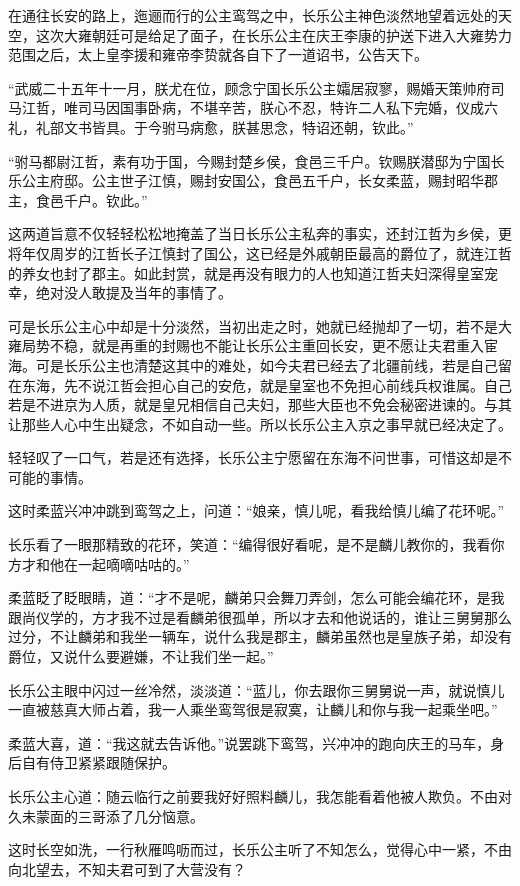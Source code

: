 在通往长安的路上，迤逦而行的公主鸾驾之中，长乐公主神色淡然地望着远处的天空，这次大雍朝廷可是给足了面子，在长乐公主在庆王李康的护送下进入大雍势力范围之后，太上皇李援和雍帝李贽就各自下了一道诏书，公告天下。

“武威二十五年十一月，朕尤在位，顾念宁国长乐公主孀居寂寥，赐婚天策帅府司马江哲，唯司马因国事卧病，不堪辛苦，朕心不忍，特许二人私下完婚，仪成六礼，礼部文书皆具。于今驸马病愈，朕甚思念，特诏还朝，钦此。”

“驸马都尉江哲，素有功于国，今赐封楚乡侯，食邑三千户。钦赐朕潜邸为宁国长乐公主府邸。公主世子江慎，赐封安国公，食邑五千户，长女柔蓝，赐封昭华郡主，食邑千户。钦此。”

这两道旨意不仅轻轻松松地掩盖了当日长乐公主私奔的事实，还封江哲为乡侯，更将年仅周岁的江哲长子江慎封了国公，这已经是外戚朝臣最高的爵位了，就连江哲的养女也封了郡主。如此封赏，就是再没有眼力的人也知道江哲夫妇深得皇室宠幸，绝对没人敢提及当年的事情了。

可是长乐公主心中却是十分淡然，当初出走之时，她就已经抛却了一切，若不是大雍局势不稳，就是再重的封赐也不能让长乐公主重回长安，更不愿让夫君重入宦海。可是长乐公主也清楚这其中的难处，如今夫君已经去了北疆前线，若是自己留在东海，先不说江哲会担心自己的安危，就是皇室也不免担心前线兵权谁属。自己若是不进京为人质，就是皇兄相信自己夫妇，那些大臣也不免会秘密进谏的。与其让那些人心中生出疑念，不如自动一些。所以长乐公主入京之事早就已经决定了。

轻轻叹了一口气，若是还有选择，长乐公主宁愿留在东海不问世事，可惜这却是不可能的事情。

这时柔蓝兴冲冲跳到鸾驾之上，问道：“娘亲，慎儿呢，看我给慎儿编了花环呢。”

长乐看了一眼那精致的花环，笑道：“编得很好看呢，是不是麟儿教你的，我看你方才和他在一起嘀嘀咕咕的。”

柔蓝眨了眨眼睛，道：“才不是呢，麟弟只会舞刀弄剑，怎么可能会编花环，是我跟尚仪学的，方才我不过是看麟弟很孤单，所以才去和他说话的，谁让三舅舅那么过分，不让麟弟和我坐一辆车，说什么我是郡主，麟弟虽然也是皇族子弟，却没有爵位，又说什么要避嫌，不让我们坐一起。”

长乐公主眼中闪过一丝冷然，淡淡道：“蓝儿，你去跟你三舅舅说一声，就说慎儿一直被慈真大师占着，我一人乘坐鸾驾很是寂寞，让麟儿和你与我一起乘坐吧。”

柔蓝大喜，道：“我这就去告诉他。”说罢跳下鸾驾，兴冲冲的跑向庆王的马车，身后自有侍卫紧紧跟随保护。

长乐公主心道：随云临行之前要我好好照料麟儿，我怎能看着他被人欺负。不由对久未蒙面的三哥添了几分恼意。

这时长空如洗，一行秋雁鸣呖而过，长乐公主听了不知怎么，觉得心中一紧，不由向北望去，不知夫君可到了大营没有？

